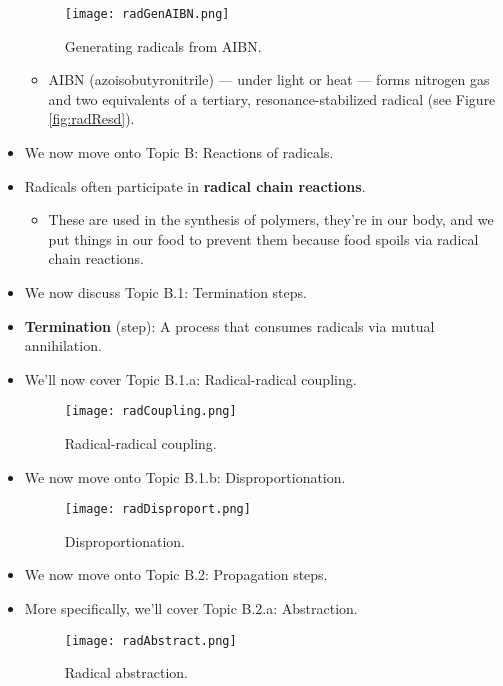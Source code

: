 \documentclass[../notes.tex]{subfiles}
\begin{document}
\begin{itemize}
    \begin{figure}[h!]
        \centering
        \texttt{[image: radGenAIBN.png]}
        \caption{Generating radicals from AIBN.}
        \label{fig:radGenAIBN}
    \end{figure}
    \begin{itemize}
        \item AIBN (azoisobutyronitrile) --- under light or heat --- forms nitrogen gas and two equivalents of a tertiary, resonance-stabilized radical (see Figure \ref{fig:radResd}).
    \end{itemize}
    \item We now move onto Topic B: Reactions of radicals.
    \item Radicals often participate in \textbf{radical chain reactions}.
    \begin{itemize}
        \item These are used in the synthesis of polymers, they're in our body, and we put things in our food to prevent them because food spoils via radical chain reactions.
    \end{itemize}
    \item We now discuss Topic B.1: Termination steps.
    \item \textbf{Termination} (step): A process that consumes radicals via mutual annihilation.
    \item We'll now cover Topic B.1.a{}: Radical-radical coupling.
    \begin{figure}[h!]
        \centering
        \texttt{[image: radCoupling.png]}
        \caption{Radical-radical coupling.}
        \label{fig:radCoupling}
    \end{figure}
    \item We now move onto Topic B.1.b{}: Disproportionation.
    \begin{figure}[H]
        \centering
        \texttt{[image: radDisproport.png]}
        \caption{Disproportionation.}
        \label{fig:radDisproport}
    \end{figure}
    \item We now move onto Topic B.2: Propagation steps.
    \item More specifically, we'll cover Topic B.2.a{}: Abstraction.
    \begin{figure}[h!]
        \centering
        \texttt{[image: radAbstract.png]}
        \caption{Radical abstraction.}
        \label{fig:radAbstract}
    \end{figure}

\end{itemize}
\end{document}
